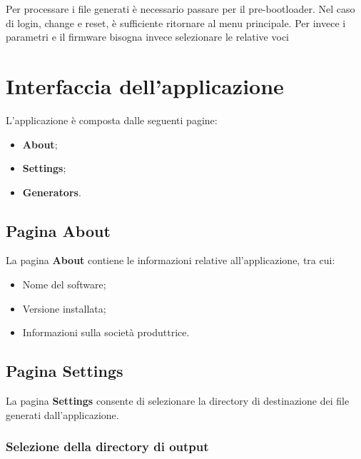 \documentclass[11pt,a4paper]{article}
\begin{document}
Per processare i file generati è necessario passare per il pre-bootloader.
Nel caso di login, change e reset, è sufficiente ritornare al menu principale.
Per invece i parametri e il firmware bisogna invece selezionare le relative voci

\section{Interfaccia dell'applicazione}

L'applicazione è composta dalle seguenti pagine:

\begin{itemize}
    \item \textbf{About};
    \item \textbf{Settings};
    \item \textbf{Generators}.
\end{itemize}

\subsection{Pagina About}

La pagina \textbf{About} contiene le informazioni relative
all'applicazione, tra cui:

\begin{itemize}
    \item Nome del software;
    \item Versione installata;
    \item Informazioni sulla società produttrice.
\end{itemize}

\subsection{Pagina Settings}

La pagina \textbf{Settings} consente di selezionare la directory
di destinazione dei file generati dall'applicazione.

\subsubsection*{Selezione della directory di output}
\end{document}
